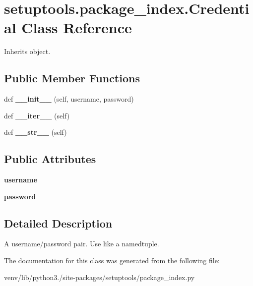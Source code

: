 \hypertarget{classsetuptools_1_1package__index_1_1_credential}{}\section{setuptools.\+package\+\_\+index.\+Credential Class Reference}
\label{classsetuptools_1_1package__index_1_1_credential}


Inherits object.

\subsection*{Public Member Functions}
\begin{DoxyCompactItemize}
\item 
\mbox{\label{classsetuptools_1_1package__index_1_1_credential_aa8da15130e5f0f03652fa5e8210c4dfc}} 
def {\bfseries \+\_\+\+\_\+init\+\_\+\+\_\+} (self, username, password)
\item 
\mbox{\label{classsetuptools_1_1package__index_1_1_credential_a8be8a44a724193a68706677c188e3a23}} 
def {\bfseries \+\_\+\+\_\+iter\+\_\+\+\_\+} (self)
\item 
\mbox{\label{classsetuptools_1_1package__index_1_1_credential_ac755b797fe6d3aa9659f1754e1ae6644}} 
def {\bfseries \+\_\+\+\_\+str\+\_\+\+\_\+} (self)
\end{DoxyCompactItemize}
\subsection*{Public Attributes}
\begin{DoxyCompactItemize}
\item 
\mbox{\label{classsetuptools_1_1package__index_1_1_credential_a6a7a5161bf18e7b62175a4a5a13413c4}} 
{\bfseries username}
\item 
\mbox{\label{classsetuptools_1_1package__index_1_1_credential_a5780ce49e865131209546a5f7d1020d6}} 
{\bfseries password}
\end{DoxyCompactItemize}


\subsection{Detailed Description}
\begin{DoxyVerb}A username/password pair. Use like a namedtuple.
\end{DoxyVerb}
 

The documentation for this class was generated from the following file\+:\begin{DoxyCompactItemize}
\item 
venv/lib/python3./site-\/packages/setuptools/package\+\_\+index.\+py\end{DoxyCompactItemize}

